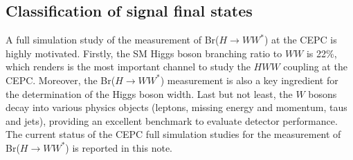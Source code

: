 \documentclass[11pt,a4paper]{cepcnote}
\begin{document}
\subsection{Classification of signal final states}
A full simulation study of the measurement of Br($H\rightarrow WW^*$) at the CEPC is highly motivated. Firstly, 
the SM Higgs boson branching ratio to $WW$ is 22\%, which renders is the most important channel 
to study the $HWW$ coupling at the CEPC. Moreover, the Br($H\rightarrow WW^*$) measurement is also 
a key ingredient for the determination of the Higgs boson width. Last but not least, the $W$ bosons decay into various physics 
objects (leptons, missing energy and momentum, taus and jets), providing an excellent benchmark to evaluate detector 
performance. The current status of the CEPC full simulation studies for the measurement of Br($H\rightarrow WW^*$)
is reported in this note. 
\end{document}

